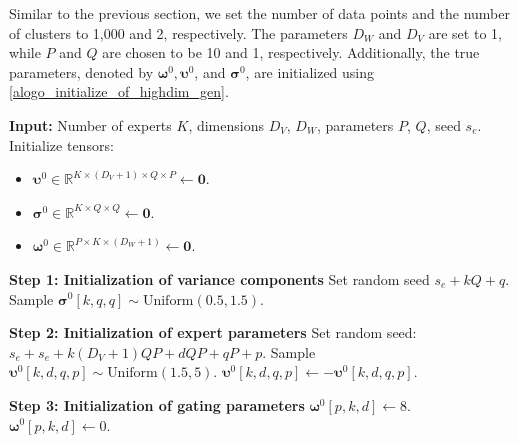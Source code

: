 \documentclass{article}
\newcommand{\zero}{\ensuremath{\mathbf{0}}}
\def\vsigma{{\bm{\sigma}}}
\def\vomega{{\bm{\omega}}}
\def\vupsilon{{\bm{\upsilon}}}
\def\sR{{\mathbb{R}}}
\begin{document}
Similar to the previous section, we set the number of data points and the number of clusters to 1,000 and 2, respectively. The parameters \( D_W \) and \( D_V \) are set to 1, while \( P \) and \( Q \) are chosen to be 10 and 1, respectively. Additionally, the true parameters, denoted by \( \vomega^0, \vupsilon^0 \), and \( \vsigma^0 \), are initialized using \cref{alogo_initialize_of_highdim_gen}.



\begin{algorithm}[H]
\caption{Initialization of \( \vomega^0 \), \( \vupsilon^0 \), and \( \vsigma^0 \) for Higher-Dimensional Simulation}
\label{alogo_initialize_of_highdim_gen}
\begin{algorithmic}[1]
\State \textbf{Input:} Number of experts \( K \), dimensions \( D_V \), \( D_W \), parameters \( P \), \( Q \), seed \( s_e \).
\State Initialize tensors:
\begin{itemize}
    \item \( \vupsilon^0 \in \sR^{K \times (D_V + 1) \times Q \times P} \gets \zero \).
    \item \( \vsigma^0 \in \sR^{K \times Q \times Q} \gets \zero \).
    \item \( \vomega^0 \in \sR^{P \times K \times (D_W + 1)} \gets \zero \).
\end{itemize}

\State \textbf{Step 1: Initialization of variance components}
        \State Set random seed \( s_e + kQ + q \).
        \State Sample \( \vsigma^0[k, q, q] \sim \text{Uniform}(0.5, 1.5) \).
    \EndFor
\EndFor

\State \textbf{Step 2: Initialization of expert parameters}
    \State Set random seed: $s_e + s_e + k(D_V+1)QP + dQP + qP + p$. 
        \State Sample \( \vupsilon^0[k, d, q, p] \sim \text{Uniform}(1.5, 5) \).
    \EndIf
        \State \( \vupsilon^0[k, d, q, p] \gets -\vupsilon^0[k, d, q, p] \).
    \EndIf
\EndFor

\State \textbf{Step 3: Initialization of gating parameters}
        \State \( \vomega^0[p, k, d] \gets 8 \).
    \Else
        \State \( \vomega^0[p, k, d] \gets 0 \).
    \EndIf
\EndFor
\end{algorithmic}
\end{algorithm}
\end{document}
